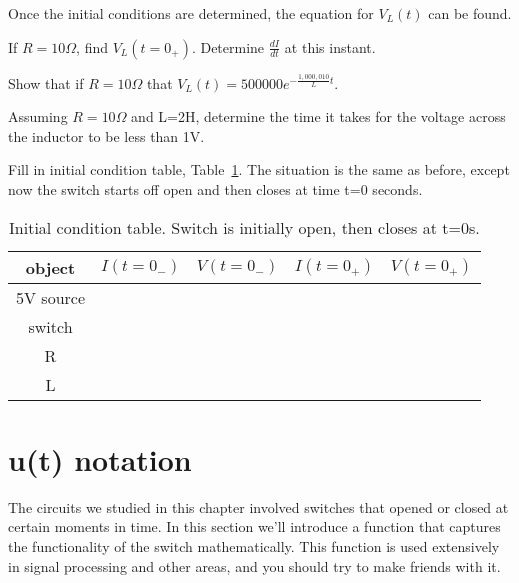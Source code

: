 Once the initial conditions are determined, the equation for $V_L(t)$ can be found.

\begin{blevel}
If $R=10\Omega$, find $V_L(t=0_+)$. Determine $\frac{dI}{dt}$ at this instant.
\end{blevel}

\begin{clevel}
Show that if $R=10\Omega$ that $V_L(t)=500000e^{-\frac{1,000,010}{L}t}$.
\end{clevel}

\begin{clevel}
Assuming $R=10\Omega$ and L=2H, determine the time it takes for the voltage across the inductor to be less than 1V.
\end{clevel}

\begin{clevel}
Fill in initial condition table, Table~\ref{T:6ICP}. The situation is the same as before, except now the switch starts off open and then closes at time t=0 seconds.
\end{clevel}

\begin{table}[H]
\begin{center}
\begin{tabular}{|c|c|c|c|c|} \hline
object	&$I(t=0_{-})$	&$V(t=0_{-})$	&$I(t=0_{+})$	&$V(t=0_{+})$ \\ \hline
5V source&&&& \\ \hline
switch&&&& \\ \hline
R&&&& \\ \hline
L&&&& \\ \hline
\end{tabular}
\caption{Initial condition table. Switch is initially open, then closes at t=0s.}
\label{T:6ICP}
\end{center}
\end{table}

\section{u(t) notation}
The circuits we studied in this chapter involved switches that opened or closed at certain moments in time. In this section we'll introduce a function that captures the functionality of the switch mathematically. This function is used extensively in signal processing and other areas, and you should try to make friends with it.\par


